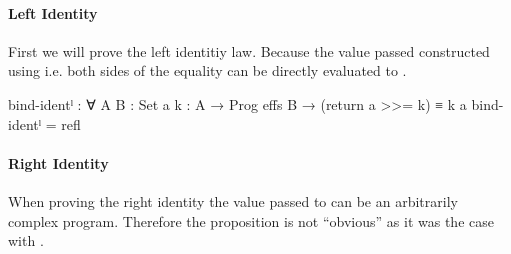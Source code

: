 \paragraph{Left Identity}
First we will prove the left identitiy law.
Because the value passed \AgdaFunction{>>=} constructed using
 i.e.  both sides of the
equality can be directly evaluated to
\AgdaSpace{}.

\begin{code}
bind-identˡ : ∀ {A B : Set} {a} {k : A → Prog effs B} →
  (return a >>= k) ≡ k a
bind-identˡ = refl
\end{code}

\paragraph{Right Identity}
When proving the right identity the value passed to \AgdaFunction{>>=} can be an
arbitrarily complex program. Therefore the proposition is not ``obvious'' as it
was the case with .

